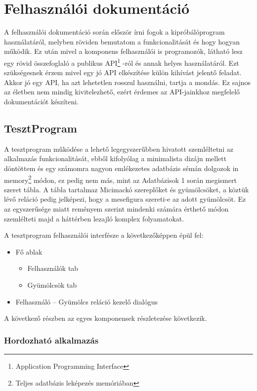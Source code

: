 \chapter {Felhasználói dokumentáció}
\label{ch:user}

A felhasználói dokumentáció során először írni fogok a kipróbálóprogram használatáról, melyben röviden bemutatom a funkcionalitását és hogy hogyan működik. Ez után mivel a komponens felhasználói is programozók, látható lesz egy rövid összefoglaló a publikus API\footnote{Application Programming Interface} -ról és annak helyes használatáról. Ezt szükségesnek érzem mivel egy jó API elkészítése külön kihívást jelentő feladat. Akkor jó egy API, ha azt lehetetlen rosszul használni, tartja a mondás. Ez sajnos az életben nem mindig kivitelezhető, ezért érdemes az API-jainkhoz megfelelő dokumentációt készíteni.

\section{TesztProgram}

A tesztprogram működése a lehető legegyszerűbben hivatott szemléltetni az alkalmazás funkcionalitását, ebből kifolyólag a minimalista dizájn mellett döntöttem és egy számomra nagyon emlékezetes adatbázis sémán dolgozok in memory\footnote{Teljes adatbázis leképezés memóriában} módon, ez pedig nem más, mint az Adatbázisok 1 során megismert szeret tábla. A tábla tartalmaz Micimackó szereplőket és gyümölcsöket, a köztük lévő reláció pedig jelképezi, hogy a mesefigura szereti-e az adott gyümölcsöt. Ez az egyszerűsége miatt reményem szerint mindenki számára érthető módon szemlélteti majd a háttérben lezajló komplex folyamatokat.

A tesztprogram felhasználói interfésze a következőképpen épül fel:
\begin{itemize}
	\item Fő ablak
    \begin{itemize}
    	\item Felhasználók tab
    	\item Gyümölcsök tab
    \end{itemize}
	\item Felhasználó – Gyümölcs reláció kezelő dialógus
\end{itemize}

A következő részben az egyes komponensek részletezése következik.

\subsection{Hordozható alkalmazás}

